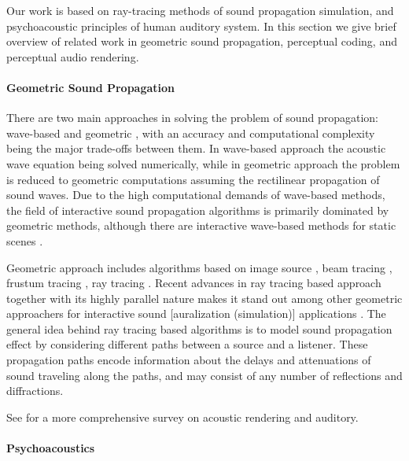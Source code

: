 Our work is based on ray-tracing methods of sound propagation simulation, and psychoacoustic principles of human auditory system. In this section we give brief overview of related work in geometric sound propagation, perceptual coding, and perceptual audio rendering.

\paragraph{Geometric Sound Propagation} 


There are two main approaches in solving the problem of sound propagation: wave-based \cite{savioja2010real,thompson2006review,gumerov2009wideband} and geometric \cite{funkhouser2003survey}, with an accuracy and computational complexity being the major trade-offs between them. In wave-based approach the acoustic wave equation being solved numerically, while in geometric approach the problem is reduced to geometric computations assuming the rectilinear propagation of sound waves. Due to the high computational demands of wave-based methods, the field of interactive sound propagation algorithms is primarily dominated by geometric methods, although there are interactive wave-based methods for static scenes \cite{raghuvanshi2010precomputed,mehra2013wave}.

Geometric approach includes algorithms based on image source \cite{borish1984extension}, beam tracing \cite{tsingos2001modeling}, frustum tracing \cite{chandak2009fastv}, ray tracing \cite{taylor2012guided,schissler2014high}. Recent advances in ray tracing based approach together with its highly parallel nature makes it stand out among other geometric approachers for interactive sound [auralization (simulation)] applications \cite{taylor2010sound,schissler2011gsound}. The general idea behind ray tracing based algorithms is to model sound propagation effect by considering different paths between a source and a listener. These propagation paths encode information about the delays and attenuations of sound traveling along the paths, and may consist of any number of reflections and diffractions. 

See \cite{hulusic2012acoustic} for a more comprehensive survey on acoustic rendering and auditory.

\paragraph{Psychoacoustics}

